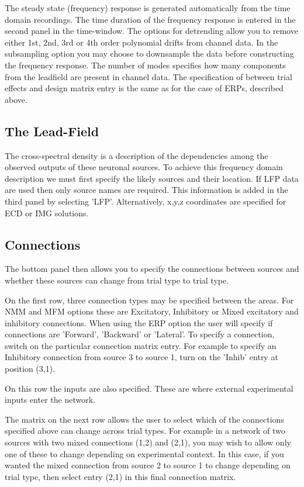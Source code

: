 The steady state (frequency) response is generated automatically from the time domain recordings. The time duration of the frequency response is entered in the second panel in the time-window.  The options for detrending allow you to remove either 1st, 2nd, 3rd or 4th order polynomial drifts from channel data. In the subsampling option you may choose to downsample the data before constructing the frequency response. The number of modes specifies how many components from the leadfield are present in channel data. The specification of between trial effects and design matrix entry is the same as for the case of ERPs, described above.

\subsection{The Lead-Field}
The cross-spectral density is a description of the dependencies among the observed outputs of these neuronal sources. To achieve this frequency domain description we must first specify the likely sources and their location. If LFP data are used then only source names are required. This information is added in the third panel by selecting 'LFP'. Alternatively, x,y,z coordinates are specified for ECD or IMG solutions.


\subsection{Connections}
The bottom panel then allows you to specify the connections between sources and whether these sources can change from trial type to trial type.

On the first row, three connection types may be specified between the areas. For NMM and MFM options these are Excitatory, Inhibitory or Mixed excitatory and inhibitory connections. When using the ERP option the user will specify if connections are 'Forward', 'Backward' or 'Lateral'. To specify a connection, switch on the particular connection matrix entry. For example to specify an Inhibitory connection from source 3 to source 1, turn on the 'Inhib' entry at position (3,1).

On this row the inputs are also specified. These are where external experimental inputs enter the network.

The matrix on the next row allows the user to select which of the connections specified above can change across trial types. For example in a network of two sources with two mixed connections (1,2) and (2,1), you may wish to allow only one of these to change depending on experimental context. In this case, if you wanted the mixed connection from source 2 to source 1 to change depending on trial type, then select entry (2,1) in this final connection matrix.


